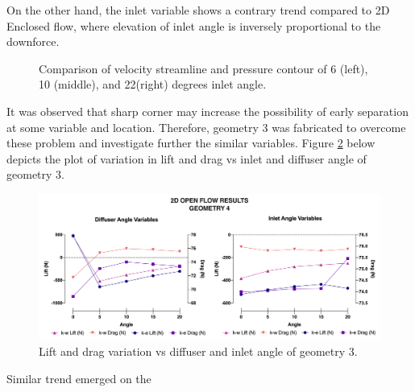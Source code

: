 \noindent On the other hand, the inlet variable shows a contrary trend compared to 2D Enclosed flow, where elevation of inlet angle is inversely proportional to the downforce. 

\begin{figure}[!hb]
   \noindent{}
   \caption{Comparison of velocity streamline and pressure contour of 6 (left), 10 (middle), and 22(right) degrees inlet angle. }
   \label{fig:A1_Contour_inlet_compare}
\end{figure}


\noindent It was observed that sharp corner may increase the possibility of early separation at some variable and location. Therefore, geometry 3 was fabricated to overcome these problem and investigate further the similar variables. Figure \ref{fig:2D_OF_A4_results} below depicts the plot of variation in lift and drag vs inlet and diffuser angle of geometry 3.

\begin{figure}[h!]
    \centering
    \includegraphics[scale=0.6]{Figures/Graph/2D_OF_A4.png}
    \caption{Lift and drag variation vs diffuser and inlet angle of geometry 3.}
    \label{fig:2D_OF_A4_results}
\end{figure}

Similar trend emerged on the



